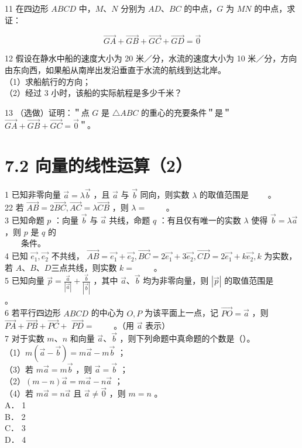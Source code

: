 \documentclass[10pt]{article}
\begin{document}
11 在四边形 \(A B C D\) 中，\(M 、 N\) 分别为 \(A D 、 B C\) 的中点，\(G\) 为 \(M N\) 的中点，求证：

\[
\overrightarrow{G A}+\overrightarrow{G B}+\overrightarrow{G C}+\overrightarrow{G D}=\overrightarrow{0}
\]

12 假设在静水中船的速度大小为 20 米／分，水流的速度大小为 10 米／分，方向由东向西，如果船从南岸出发沿垂直于水流的航线到达北岸。\\
（1）求船航行的方向；\\
（2）经过 3 小时，该船的实际航程是多少千米？

13 （选做）证明：＂点 \(G\) 是 \(\triangle A B C\) 的重心的充要条件＂是＂ \(\overrightarrow{G A}+\overrightarrow{G B}+\overrightarrow{G C}=\overrightarrow{0}\)＂。

\section*{7.2 向量的线性运算（2）}
1 已知非零向量 \(\vec{a}=\lambda \vec{b}\) ，且 \(\vec{a}\) 与 \(\vec{b}\) 同向，则实数 \(\lambda\) 的取值范围是 \(\qquad\)。\\
22 若 \(\overrightarrow{A B}=2 \overrightarrow{B C}, \overrightarrow{A C}=\lambda \overrightarrow{C B}\) ，则 \(\lambda=\) \(\qquad\)。\\
3 已知命题 \(p\) ：向量 \(\vec{b}\) 与 \(\vec{a}\) 共线，命题 \(q\) ：有且仅有唯一的实数 \(\lambda\) 使得 \(\vec{b}=\lambda \vec{a}\) ，则 \(p\) 是 \(q\) 的\\
\(\qquad\)条件。\\
4 已知 \(\overrightarrow{e_{1}}, \overrightarrow{e_{2}}\) 不共线， \(\overrightarrow{A B}=\overrightarrow{e_{1}}+\overrightarrow{e_{2}}, \overrightarrow{B C}=2 \overrightarrow{e_{1}}+3 \overrightarrow{e_{2}}, \overrightarrow{C D}=2 \overrightarrow{e_{1}}+k \overrightarrow{e_{2}}, k\) 为实数，若 \(A 、 B 、 D\)三点共线，则实数 \(k=\) \(\qquad\)。\\
5 已知向量 \(\vec{p}=\frac{\vec{a}}{|\vec{a}|}+\frac{\vec{b}}{|\vec{b}|}\) ，其中 \(\vec{a} 、 \vec{b}\) 均为非零向量，则 \(|\vec{p}|\) 的取值范围是 \(\qquad\)。\\
6 若平行四边形 \(A B C D\) 的中心为 \(O, P\) 为该平面上一点，记 \(\overrightarrow{P O}=\vec{a}\) ，则 \(\overrightarrow{P A}+\overrightarrow{P B}+\overrightarrow{P C}+\) \(\overrightarrow{P D}=\) \(\qquad\)。（用 \(\vec{a}\) 表示）\\
7 对于实数 \(m 、 n\) 和向量 \(\vec{a} 、 \vec{b}\) ，则下列命题中真命题的个数是（）。\\
（1）\(m(\vec{a}-\vec{b})=m \vec{a}-m \vec{b}\) ；\\
（3）若 \(m \vec{a}=m \vec{b}\) ，则 \(\vec{a}=\vec{b}\) ；\\
（2）\((m-n) \vec{a}=m \vec{a}-n \vec{a}\) ；\\
（4）若 \(m \vec{a}=n \vec{a}\) 且 \(\vec{a} \neq \overrightarrow{0}\) ，则 \(m=n\) 。\\
A． 1\\
B． 2\\
C． 3\\
D． 4
\end{document}

